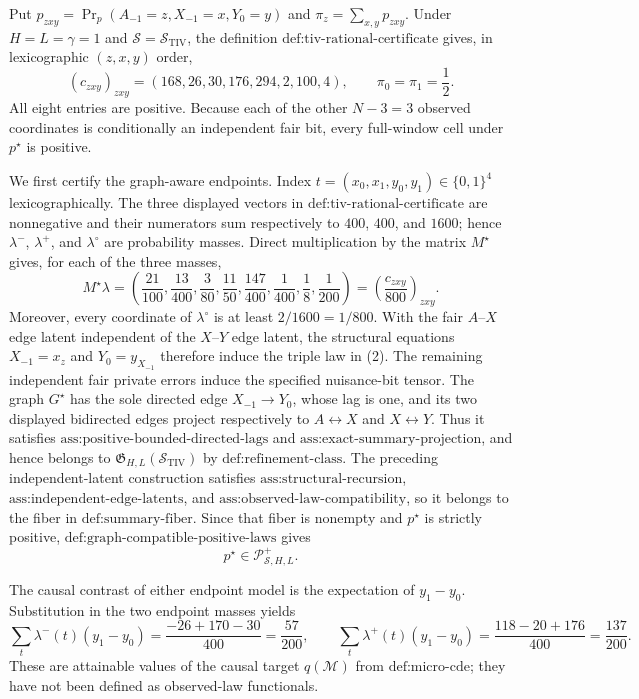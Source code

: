 Put \(p_{zxy}=\Pr_p(A_{-1}=z,X_{-1}=x,Y_0=y)\) and \(\pi_z=\sum_{x,y}p_{zxy}\).  Under \(H=L=\gamma=1\) and \(\mathcal S=\mathcal S_{\mathrm{TIV}}\), the definition \(\text{def:tiv-rational-certificate}\) gives, in lexicographic \((z,x,y)\) order,
\[
(c_{zxy})_{zxy}=(168,26,30,176,294,2,100,4),
\qquad
\pi_0=\pi_1=\frac12.
\tag{1}
\]
All eight entries are positive.  Because each of the other \(N-3=3\) observed coordinates is conditionally an independent fair bit, every full-window cell under \(p^{\star}\) is positive.

We first certify the graph-aware endpoints.  Index \(t=(x_0,x_1,y_0,y_1)\in\{0,1\}^4\) lexicographically.  The three displayed vectors in \(\text{def:tiv-rational-certificate}\) are nonnegative and their numerators sum respectively to \(400\), \(400\), and \(1600\); hence \(\lambda^-\), \(\lambda^+\), and \(\lambda^{\circ}\) are probability masses.  Direct multiplication by the matrix \(M^{\star}\) gives, for each of the three masses,
\[
M^{\star}\lambda
=\left(
\frac{21}{100},\frac{13}{400},\frac{3}{80},\frac{11}{50},
\frac{147}{400},\frac{1}{400},\frac18,\frac{1}{200}
\right)
=\left(\frac{c_{zxy}}{800}\right)_{zxy}.
\tag{2}
\]
Moreover, every coordinate of \(\lambda^{\circ}\) is at least \(2/1600=1/800\).  With the fair \(A\)--\(X\) edge latent independent of the \(X\)--\(Y\) edge latent, the structural equations \(X_{-1}=x_z\) and \(Y_0=y_{X_{-1}}\) therefore induce the triple law in (2).  The remaining independent fair private errors induce the specified nuisance-bit tensor.  The graph \(G^{\star}\) has the sole directed edge \(X_{-1}\to Y_0\), whose lag is one, and its two displayed bidirected edges project respectively to \(A\leftrightarrow X\) and \(X\leftrightarrow Y\).  Thus it satisfies \(\text{ass:positive-bounded-directed-lags}\) and \(\text{ass:exact-summary-projection}\), and hence belongs to \(\mathfrak G_{H,L}(\mathcal S_{\mathrm{TIV}})\) by \(\text{def:refinement-class}\).  The preceding independent-latent construction satisfies \(\text{ass:structural-recursion}\), \(\text{ass:independent-edge-latents}\), and \(\text{ass:observed-law-compatibility}\), so it belongs to the fiber in \(\text{def:summary-fiber}\).  Since that fiber is nonempty and \(p^{\star}\) is strictly positive, \(\text{def:graph-compatible-positive-laws}\) gives
\[
p^{\star}\in\mathcal P_{\mathcal S,H,L}^{+}.
\tag{3}
\]

The causal contrast of either endpoint model is the expectation of \(y_1-y_0\).  Substitution in the two endpoint masses yields
\[
\sum_t\lambda^-(t)(y_1-y_0)
=\frac{-26+170-30}{400}=\frac{57}{200},
\qquad
\sum_t\lambda^+(t)(y_1-y_0)
=\frac{118-20+176}{400}=\frac{137}{200}.
\tag{4}
\]
These are attainable values of the causal target \(q(\mathcal M)\) from \(\text{def:micro-cde}\); they have not been defined as observed-law functionals.

